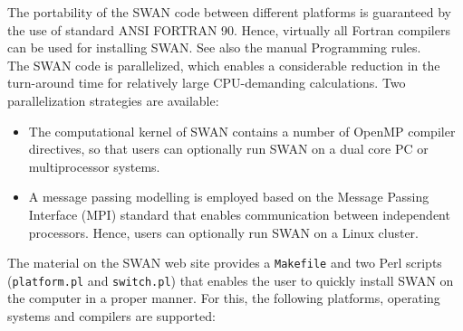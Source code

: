 \documentclass[12pt]{book}
\begin{document}
 \label{ch:instal}

The portability of the SWAN code between different platforms is guaranteed by the use of standard ANSI
FORTRAN 90. Hence, virtually all Fortran compilers can be used for installing SWAN. See also the manual Programming rules.
\\[2ex]
\noindent
The SWAN code is parallelized, which enables a considerable reduction in the turn-around time for relatively
large CPU-demanding calculations. Two parallelization strategies are available:
\begin{itemize}
  \item The computational kernel of SWAN contains a number of OpenMP compiler directives, so that users can
        optionally run SWAN on a dual core PC or multiprocessor systems.
  \item A message passing modelling is employed based on the Message Passing Interface (MPI) standard that
        enables communication between independent processors. Hence, users can optionally run SWAN on a
        Linux cluster.
\end{itemize}
\noindent
The material on the SWAN web site provides a {\tt Makefile} and two Perl scripts ({\tt platform.pl}
and {\tt switch.pl}) that enables the user to quickly install SWAN on the computer in a
proper manner. For this, the following platforms, operating systems and compilers are supported:
\newpage
\end{document}
